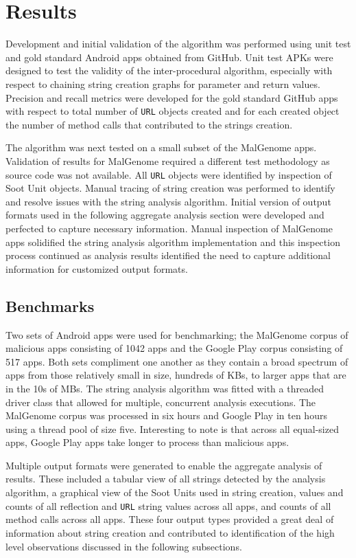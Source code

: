 \section{Results}
\label{sec:results}
Development and initial validation of the algorithm was performed using unit
test and gold standard Android apps obtained from GitHub.  Unit test APKs were
designed to test the validity of the inter-procedural algorithm, especially with
respect to chaining string creation graphs for parameter and return values.
Precision and recall metrics were developed for the gold standard GitHub apps
with respect to total number of \texttt{URL} objects created and for each
created object the number of method calls that contributed to the strings
creation.  

The algorithm was next tested on a small subset of the MalGenome apps.
Validation of results for MalGenome required a different test methodology as
source code was not available.  All \texttt{URL} objects were identified by
inspection of Soot Unit objects.  Manual tracing of string creation was
performed to identify and resolve issues with the string analysis algorithm.
Initial version of output formats used in the following aggregate analysis
section were developed and perfected to capture necessary information.  Manual
inspection of MalGenome apps solidified the string analysis algorithm
implementation and this inspection process continued as analysis results
identified the need to capture additional information for customized output
formats.

\subsection{Benchmarks}
Two sets of Android apps were used for benchmarking;  the MalGenome corpus of
malicious apps consisting of 1042 apps and the Google Play corpus consisting of
517 apps.  Both sets compliment one another as they contain a broad spectrum of
apps from those relatively small in size, hundreds of KBs, to larger apps that
are in the 10s of MBs.  The string analysis algorithm was fitted with a threaded
driver class that allowed for multiple, concurrent analysis executions.  The
MalGenome corpus was processed in six hours and Google Play in ten hours using a
thread pool of size five.  Interesting to note is that across all equal-sized
apps, Google Play apps take longer to process than malicious apps.

Multiple output formats were generated to enable the aggregate analysis of results.  These included a tabular view of all strings detected by the analysis algorithm, a graphical view of the Soot Units used in string creation, values and counts of all reflection and \texttt{URL} string values across all apps, and counts of all method calls across all apps.  These four output types provided a great deal of information about string creation and contributed to identification of the high level observations discussed in the following subsections.

